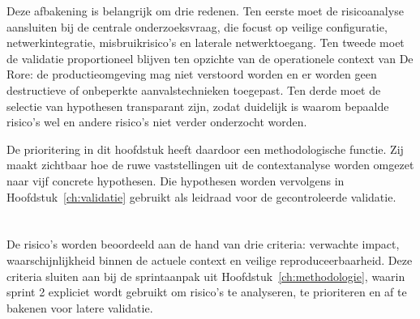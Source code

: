 Deze afbakening is belangrijk om drie redenen. Ten eerste moet de risicoanalyse aansluiten bij de centrale onderzoeksvraag, die focust op veilige configuratie, netwerkintegratie, misbruikrisico's en laterale netwerktoegang. Ten tweede moet de validatie proportioneel blijven ten opzichte van de operationele context van De Rore: de productieomgeving mag niet verstoord worden en er worden geen destructieve of onbeperkte aanvalstechnieken toegepast. Ten derde moet de selectie van hypothesen transparant zijn, zodat duidelijk is waarom bepaalde risico's wel en andere risico's niet verder onderzocht worden.

De prioritering in dit hoofdstuk heeft daardoor een methodologische functie. Zij maakt zichtbaar hoe de ruwe vaststellingen uit de contextanalyse worden omgezet naar vijf concrete hypothesen. Die hypothesen worden vervolgens in Hoofdstuk~\ref{ch:validatie} gebruikt als leidraad voor de gecontroleerde validatie.

\section{}%
\label{sec:prioriteringscriteria}

De risico's worden beoordeeld aan de hand van drie criteria: verwachte impact, waarschijnlijkheid binnen de actuele context en veilige reproduceerbaarheid. Deze criteria sluiten aan bij de sprintaanpak uit Hoofdstuk~\ref{ch:methodologie}, waarin sprint 2 expliciet wordt gebruikt om risico's te analyseren, te prioriteren en af te bakenen voor latere validatie.

